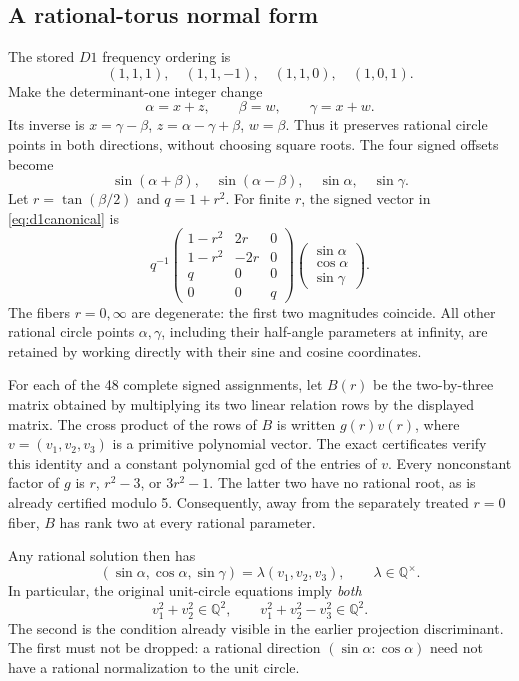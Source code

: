 \documentclass[11pt,letterpaper]{article}
\theoremstyle{definition}\newtheorem{definition}[theorem]{Definition}
\theoremstyle{remark}\newtheorem{remark}[theorem]{Remark}
\newcommand{\Q}{\mathbb Q}\newcommand{\Z}{\mathbb Z}\newcommand{\R}{\mathbb R}
\begin{document}
\subsection{A rational-torus normal form}
The stored $D1$ frequency ordering is
\[
 (1,1,1),\quad(1,1,-1),\quad(1,1,0),\quad(1,0,1).
\]
Make the determinant-one integer change
\[
 \alpha=x+z,\qquad\beta=w,\qquad\gamma=x+w.
\]
Its inverse is $x=\gamma-\beta$, $z=\alpha-\gamma+\beta$, $w=\beta$. Thus it preserves rational circle points in both directions, without choosing square roots. The four signed offsets become
\begin{equation}\label{eq:d1canonical}
 \sin(\alpha+\beta),\quad\sin(\alpha-\beta),\quad\sin\alpha,\quad\sin\gamma.
\end{equation}
Let $r=\tan(\beta/2)$ and $q=1+r^2$. For finite $r$, the signed vector in \eqref{eq:d1canonical} is
\[
 q^{-1}\begin{pmatrix}
 1-r^2&2r&0\\1-r^2&-2r&0\\q&0&0\\0&0&q
 \end{pmatrix}
 \begin{pmatrix}\sin\alpha\\\cos\alpha\\\sin\gamma\end{pmatrix}.
\]
The fibers $r=0,\infty$ are degenerate: the first two magnitudes coincide. All other rational circle points $\alpha,\gamma$, including their half-angle parameters at infinity, are retained by working directly with their sine and cosine coordinates.

For each of the 48 complete signed assignments, let $B(r)$ be the two-by-three matrix obtained by multiplying its two linear relation rows by the displayed matrix. The cross product of the rows of $B$ is written $g(r)v(r)$, where $v=(v_1,v_2,v_3)$ is a primitive polynomial vector. The exact certificates verify this identity and a constant polynomial gcd of the entries of $v$. Every nonconstant factor of $g$ is $r$, $r^2-3$, or $3r^2-1$. The latter two have no rational root, as is already certified modulo 5. Consequently, away from the separately treated $r=0$ fiber, $B$ has rank two at every rational parameter.

Any rational solution then has
\[
 (\sin\alpha,\cos\alpha,\sin\gamma)=\lambda(v_1,v_2,v_3),\qquad \lambda\in\Q^\times.
\]
In particular, the original unit-circle equations imply \emph{both}
\begin{equation}\label{eq:d1twonorms}
 v_1^2+v_2^2\in\Q^2,\qquad
 v_1^2+v_2^2-v_3^2\in\Q^2.
\end{equation}
The second is the condition already visible in the earlier projection discriminant. The first must not be dropped: a rational direction $(\sin\alpha:\cos\alpha)$ need not have a rational normalization to the unit circle.
\end{document}
